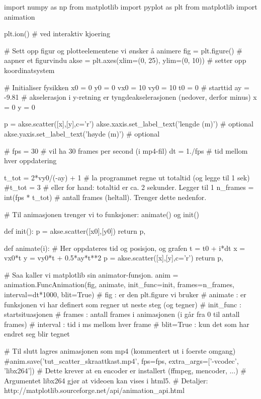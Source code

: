 \begin{usncodebox}
import numpy as np
from matplotlib import pyplot as plt
from matplotlib import animation

plt.ion()   # ved interaktiv kjoering 

# Sett opp figur og plotteelementene vi ønsker å animere
fig = plt.figure()                           # aapner et figurvindu
akse = plt.axes(xlim=(0, 25), ylim=(0, 10))  # setter opp koordinatsystem

# Initialiser fysikken
x0  = 0
y0  = 0
vx0 = 10
vy0 = 10
t0  = 0      # starttid
ay  = -9.81  # akselerasjon i y-retning er tyngdeakselerasjonen (nedover, derfor minus)
x   = 0
y   = 0

p = akse.scatter([x],[y],c='r')
akse.xaxis.set_label_text('lengde (m)')  # optional
akse.yaxis.set_label_text('høyde (m)')   # optional

# 
fps = 30      # vil ha 30 frames per second (i mp4-fil)
dt = 1./fps   # tid mellom hver oppdatering 

t_tot = 2*vy0/(-ay) + 1      # la programmet regne ut totaltid (og legge til 1 sek)
#t_tot = 3                   # eller for hand: totaltid er ca. 2 sekunder. Legger til 1
n_frames = int(fps * t_tot)  # antall frames (heltall). Trenger dette nedenfor. 



# Til animasjonen trenger vi to funksjoner: animate() og init() 

def init():
    p = akse.scatter([x0],[y0])
    return p,


def animate(i):
    # Her oppdateres tid og posisjon, og grafen
    t = t0 + i*dt
    x = vx0*t
    y = vy0*t + 0.5*ay*t**2
    p = akse.scatter([x],[y],c='r')
    return p,
    

# Saa kaller vi matplotlib sin animator-funsjon.  
anim = animation.FuncAnimation(fig, animate, init_func=init, frames=n_frames, interval=dt*1000, blit=True)
# fig       : er den plt.figure vi bruker
# animate   : er funksjonen vi har definert som regner ut neste steg (og tegner)
# init_func : startsituasjonen
# frames    : antall frames i animasjonen (i går fra 0 til antall frames)
# interval  : tid i ms mellom hver frame 
# blit=True : kun det som har endret seg blir tegnet 


# Til slutt lagres animasjonen som mp4 (kommentert ut i foerste omgang)
#anim.save('tut_scatter_skraattkast.mp4', fps=fps, extra_args=['-vcodec', 'libx264'])
# Dette krever at en encoder er installert (ffmpeg, mencoder, ...)
# Argumentet libx264 gjør at videoen kan vises i html5. 
# Detaljer:  http://matplotlib.sourceforge.net/api/animation_api.html
\end{usncodebox}

